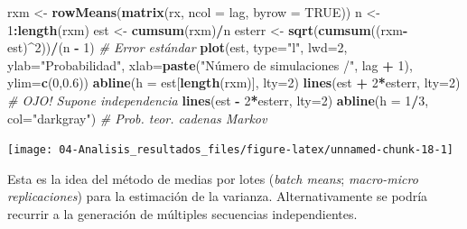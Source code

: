 \documentclass[]{book}
\newenvironment{Shaded}{\begin{snugshade}}{\end{snugshade}}
\newcommand{\KeywordTok}[1]{\textcolor[rgb]{0.13,0.29,0.53}{\textbf{#1}}}
\newcommand{\DataTypeTok}[1]{\textcolor[rgb]{0.13,0.29,0.53}{#1}}
\newcommand{\DecValTok}[1]{\textcolor[rgb]{0.00,0.00,0.81}{#1}}
\newcommand{\FloatTok}[1]{\textcolor[rgb]{0.00,0.00,0.81}{#1}}
\newcommand{\StringTok}[1]{\textcolor[rgb]{0.31,0.60,0.02}{#1}}
\newcommand{\CommentTok}[1]{\textcolor[rgb]{0.56,0.35,0.01}{\textit{#1}}}
\newcommand{\OtherTok}[1]{\textcolor[rgb]{0.56,0.35,0.01}{#1}}
\newcommand{\OperatorTok}[1]{\textcolor[rgb]{0.81,0.36,0.00}{\textbf{#1}}}
\newcommand{\NormalTok}[1]{#1}
\theoremstyle{definition}
\theoremstyle{definition}
\theoremstyle{definition}
\theoremstyle{remark}
\begin{document}
\begin{Shaded}
\begin{Highlighting}[]
\NormalTok{rxm <-}\StringTok{ }\KeywordTok{rowMeans}\NormalTok{(}\KeywordTok{matrix}\NormalTok{(rx, }\DataTypeTok{ncol =}\NormalTok{ lag, }\DataTypeTok{byrow =} \OtherTok{TRUE}\NormalTok{))}
\NormalTok{n <-}\StringTok{ }\DecValTok{1}\OperatorTok{:}\KeywordTok{length}\NormalTok{(rxm)}
\NormalTok{est <-}\StringTok{ }\KeywordTok{cumsum}\NormalTok{(rxm)}\OperatorTok{/}\NormalTok{n}
\NormalTok{esterr <-}\StringTok{ }\KeywordTok{sqrt}\NormalTok{(}\KeywordTok{cumsum}\NormalTok{((rxm}\OperatorTok{-}\NormalTok{est)}\OperatorTok{^}\DecValTok{2}\NormalTok{))}\OperatorTok{/}\NormalTok{(n }\OperatorTok{-}\StringTok{ }\DecValTok{1}\NormalTok{)  }\CommentTok{# Error estándar}
\KeywordTok{plot}\NormalTok{(est, }\DataTypeTok{type=}\StringTok{"l"}\NormalTok{, }\DataTypeTok{lwd=}\DecValTok{2}\NormalTok{, }\DataTypeTok{ylab=}\StringTok{"Probabilidad"}\NormalTok{, }
     \DataTypeTok{xlab=}\KeywordTok{paste}\NormalTok{(}\StringTok{"Número de simulaciones /"}\NormalTok{, lag }\OperatorTok{+}\StringTok{ }\DecValTok{1}\NormalTok{), }\DataTypeTok{ylim=}\KeywordTok{c}\NormalTok{(}\DecValTok{0}\NormalTok{,}\FloatTok{0.6}\NormalTok{))}
\KeywordTok{abline}\NormalTok{(}\DataTypeTok{h =}\NormalTok{ est[}\KeywordTok{length}\NormalTok{(rxm)], }\DataTypeTok{lty=}\DecValTok{2}\NormalTok{)}
\KeywordTok{lines}\NormalTok{(est }\OperatorTok{+}\StringTok{ }\DecValTok{2}\OperatorTok{*}\NormalTok{esterr, }\DataTypeTok{lty=}\DecValTok{2}\NormalTok{) }\CommentTok{# OJO! Supone independencia}
\KeywordTok{lines}\NormalTok{(est }\OperatorTok{-}\StringTok{ }\DecValTok{2}\OperatorTok{*}\NormalTok{esterr, }\DataTypeTok{lty=}\DecValTok{2}\NormalTok{)}
\KeywordTok{abline}\NormalTok{(}\DataTypeTok{h =} \DecValTok{1}\OperatorTok{/}\DecValTok{3}\NormalTok{, }\DataTypeTok{col=}\StringTok{"darkgray"}\NormalTok{)     }\CommentTok{# Prob. teor. cadenas Markov}
\end{Highlighting}
\end{Shaded}

\begin{center}\texttt{[image: 04-Analisis\_resultados\_files/figure-latex/unnamed-chunk-18-1]} \end{center}

Esta es la idea del método de medias por lotes (\emph{batch means};
\emph{macro-micro replicaciones}) para la estimación de la varianza.
Alternativamente se podría recurrir a la generación de múltiples
secuencias independientes.
\end{document}
